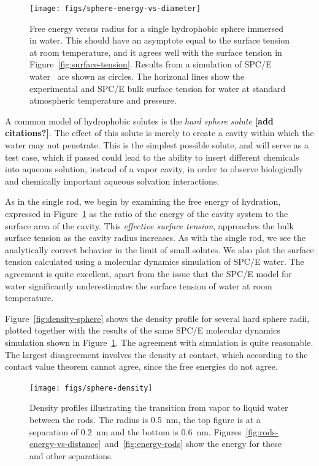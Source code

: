 \documentclass[letterpaper,twocolumn,amsmath,amssymb,prb]{revtex4-1}
\newcommand{\red}[1]{{\bf \color{red} #1}}
\newcommand{\fixme}[1]{\red{[#1]}}
\begin{document}
\begin{figure}
\begin{center}
\texttt{[image: figs/sphere-energy-vs-diameter]}
\end{center}
\caption{ Free energy versus radius for a single hydrophobic sphere
  immersed in water. This should have an asymptote equal to the
  surface tension at room temperature, and it agrees well with the
  surface tension in Figure~\ref{fig:surface-tension}. Results from a
  simulation of SPC/E water~\cite{huang2001shs} are shown as circles.
  The horizonal lines show the experimental and SPC/E bulk surface
  tension for water at standard atmospheric temperature and
  pressure. }
\label{fig:sphere-energy-vs-diameter}
\end{figure}

A common model of hydrophobic solutes is the \emph{hard sphere solute}
\fixme{add citations?}.  The effect of this solute is merely to create
a cavity within which the water may not penetrate.  This is the
simplest possible solute, and will serve as a test case, which if
passed could lead to the ability to insert different chemicals into
aqueous solution, instead of a vapor cavity, in order to observe
biologically and chemically important aqueous solvation interactions.

As in the single rod, we begin by examining the free energy of
hydration, expressed in Figure~\ref{fig:sphere-energy-vs-diameter} as
the ratio of the energy of the cavity system to the surface area of
the cavity.  This \emph{effective surface tension}, approaches the
bulk surface tension as the cavity radius increases.  As with the
single rod, we see the analytically correct behavior in the limit of
small solutes.  We also plot the surface tension calculated using a
molecular dynamics simulation of SPC/E water\cite{huang2001shs}.  The
agreement is quite excellent, apart from the issue that the SPC/E
model for water significantly underestimates the surface tension of
water at room temperature\cite{vega2007surface}.

Figure~\ref{fig:density-sphere} shows the density profile for several
hard sphere radii, plotted together with the results of the same
SPC/E molecular dynamics simulation shown in
Figure~\ref{fig:sphere-energy-vs-diameter}\cite{huang2001shs}.  The
agreement with simulation is quite reasonable.  The largest
disagreement involves the density at contact, which according to the
contact value theorem cannot agree, since the free energies do not
agree.

\begin{figure}
\begin{center}
\texttt{[image: figs/sphere-density]}
\end{center}
\caption{ Density profiles illustrating the transition from vapor 
to liquid water between the rods. The radius is 0.5~nm, the top figure is 
at a separation of 0.2~nm and the
bottom is 0.6~nm. Figures~\ref{fig:rods-energy-vs-distance}~and~\ref{fig:energy-rods} show
the energy for these and other separations.}
\label{fig:sphere-density}
\end{figure}
\end{document}
